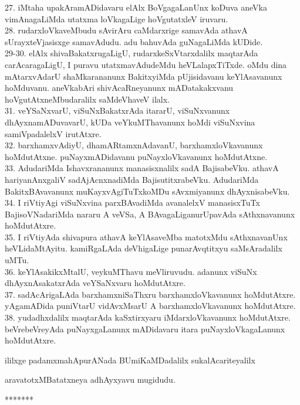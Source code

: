 \documentclass{article}
\begin{document}
27. iMtaha upakAramADidavaru elAlx BoVgagaLanUnx koDuva aneVka vimAnagaLiMda utatxma loVkagaLige hoVgutatxleV iruvaru.\\
28. rudarxloVkaveMbudu sAvirAru caMdarxrige samavAda athavA sUrayxteVjasisxge samavAdudu. adu bahuvAda guNagaLiMda kUDide.\\
29-30. elAlx shivaBakatxrugaLigU, rudarxkeSxVtarxdalilx maqtarAda carAcaragaLigU, I puravu utatxmavAdudeMdu heVLalapxTiTxde. oMdu dina mAtarxvAdarU shaMkarananunx BakitxyiMda pUjisidavanu keYlAsavanunx hoMduvanu. aneVkabAri shivAcaRneyanunx mADatakakxvanu hoVgutAtxneMbudaralilx saMdeVhaveV ilalx.\\
31. veYSaNxvarU, viSuNxBakatxrAda itararU, viSuNxvanunx dhAyxnamADuvavarU, kUDa veYkuMThavanunx hoMdi viSuNxvina samiVpadalelxV irutAtxre.\\
32. barxhamxvAdiyU, dhamARtamxnAdavanU, barxhamxloVkavanunx hoMdutAtxne. puNayxmADidavanu puNayxloVkavanunx hoMdutAtxne.\\
33. AdudariMda Ishavxrananunx manasisxnalilx sadA BajisabeVku. athavA hariyanAnxgaliV sadAjAcnxnadiMda BajisutitxrabeVku. AdudariMda BakitxBAvavanunx muKayxvAgiTuTxkoMDu sAvxmiyanunx dhAyxnisabeVku.\\
34. I riVtiyAgi viSuNxvina parxBAvadiMda avanalelxV manasisxTuTx BajisoVNadariMda nararu A veVSa, A BAvagaLiganurUpavAda sAthxnavanunx hoMdutAtxre.\\
35. I riVtiyAda shivapura athavA keYlAsaveMba matotxMdu sAthxnavanUnx heVLidaMtAyitu. kamiRgaLAda deVhigaLige punarAvqtitxyu saMsAradalilx uMTu.\\
36. keYlAsakikxMtalU, veykuMThavu meVliruvudu. adanunx viSuNx dhAyxnAsakatxrAda veYSaNxvaru hoMdutAtxre.\\
37. sadAcArigaLAda barxhamxniSaThxru barxhamxloVkavanunx hoMdutAtxre. yAgamADida puniVtarU vidAvxMsarU A barxhamxloVkavanunx hoMdutAtxre.\\
38. yudadhxdalilx maqtarAda kaSxtirxyaru iMdarxloVkavanunx hoMdutAtxre. beVrebeVreyAda puNayxgaLanunx mADidavaru itara puNayxloVkagaLanunx hoMdutAtxre.\\

\begin{center}
ililxge padamxmahApurANada BUmiKaMDadalilx sukalAcariteyalilx
\end{center}

\begin{center}
aravatotxMBatatxneya adhAyxyavu mugidudu.
\end{center}

\begin{center}
*******
\end{center}
\end{document}
